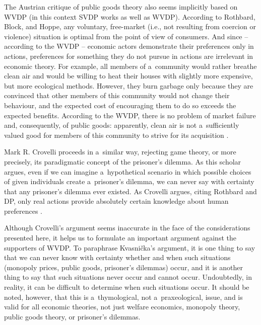 The Austrian critique of public goods theory also seems implicitly based on WVDP (in this context SVDP works as well as WVDP). According to Rothbard, Block, and Hoppe, any voluntary, free-market (i.e., not resulting from coercion or violence) situation is optimal from the point of view of consumers. And since -- according to the WVDP -- economic actors demonstrate their preferences only in actions, preferences for something they do not pursue in actions are irrelevant in economic theory. For example, all members of a~community would rather breathe clean air and would be willing to heat their houses with slightly more expensive, but more ecological methods. However, they burn garbage only because they are convinced that other members of this community would not change their behaviour, and the expected cost of encouraging them to do so exceeds the expected benefits. According to the WVDP, there is no problem of market failure and, consequently, of public goods: apparently, clean air is not a~sufficiently valued good for members of this community to strive for its acquisition 
\parencites[][]{block_public_1983}[][]{hoppe_theory_1989}[][]{hoppe_economics_2006}[][]{wisniewski_economics_2018}.%




Mark R. Crovelli proceeds in a~similar way, rejecting game theory, or more precisely, its paradigmatic concept of the prisoner's dilemma. As this scholar argues, even if we can imagine a~hypothetical scenario in which possible choices of given individuals create a~prisoner's dilemma, we can never say with certainty that any prisoner's dilemma ever existed. As Crovelli argues, citing Rothbard and DP, only real actions provide absolutely certain knowledge about human preferences 
\parencite[][]{crovelli_trouble_2006}.%




Although Crovelli's argument seems inaccurate in the face of the considerations presented here, it helps us to formulate an important argument against the supporters of WVDP. To paraphrase Kvasnička's argument, it is one thing to say that we can never know with certainty whether and when such situations (monopoly prices, public goods, prisoner's dilemmas) occur, and it is another thing to say that such situations never occur and cannot occur. Undoubtedly, in reality, it can be difficult to determine when such situations occur. It should be noted, however, that this is a~thymological, not a~praxeological, issue, and is valid for all economic theories, not just welfare economics, monopoly theory, public goods theory, or prisoner's dilemmas.



